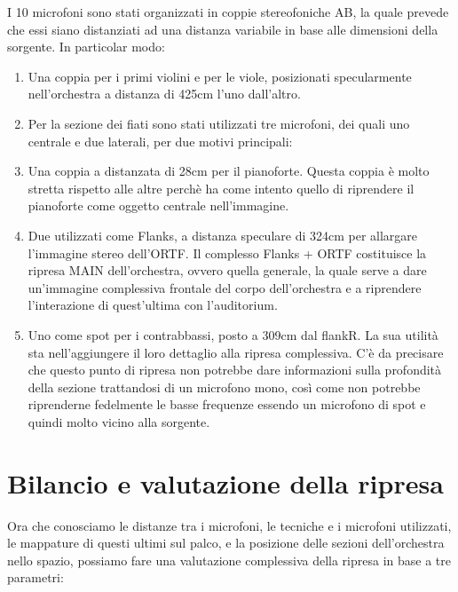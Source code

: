 	I 10 microfoni sono stati organizzati in coppie stereofoniche AB, la quale prevede che essi siano distanziati ad una distanza variabile in base alle dimensioni della sorgente. In particolar modo:
	
	\begin{enumerate}
		\item Una coppia per i primi violini e per le viole, posizionati specularmente nell'orchestra a distanza di 425cm l'uno dall'altro.
		
		\item Per la sezione dei fiati sono stati utilizzati tre microfoni, dei quali uno centrale e due laterali, per due motivi principali:
		
		\item Una coppia a distanzata di 28cm per il pianoforte. Questa coppia è molto stretta rispetto alle altre perchè ha come intento quello di riprendere il pianoforte come oggetto centrale nell'immagine.
		
		\item Due utilizzati come Flanks, a distanza speculare di 324cm per allargare l'immagine stereo dell'ORTF. Il complesso Flanks + ORTF costituisce la ripresa MAIN dell'orchestra, ovvero quella generale, la quale serve a dare un'immagine complessiva frontale del corpo dell'orchestra e a riprendere l'interazione di quest'ultima con l'auditorium.
		
		\item Uno come spot per i contrabbassi, posto a 309cm dal flankR. La sua utilità sta nell'aggiungere il loro dettaglio alla ripresa complessiva. C'è da precisare che questo punto di ripresa non potrebbe dare informazioni sulla profondità della sezione trattandosi di un microfono mono, così come non potrebbe riprenderne fedelmente le basse frequenze essendo un microfono di spot e quindi molto vicino alla sorgente.
	\end{enumerate}
	
	\section*{Bilancio e valutazione della ripresa}
	Ora che conosciamo le distanze tra i microfoni, le tecniche e i microfoni utilizzati, le mappature di questi ultimi sul palco, e la posizione delle sezioni dell'orchestra nello spazio, possiamo fare una valutazione complessiva della ripresa in base a tre parametri:
	
